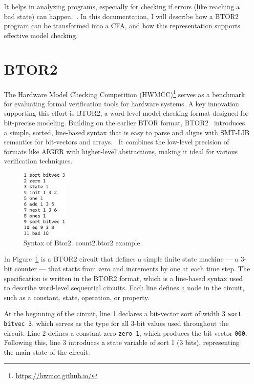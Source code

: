 It helps in analyzing programs, especially for checking if errors (like reaching a bad state) can happen.~\cite{cfa}. In this documentation, I will describe how a BTOR2 program can be transformed into a CFA, and how this representation supports effective model checking.


\section{BTOR2}
The Hardware Model Checking Competition (HWMCC)\footnote{\url{https://hwmcc.github.io/}} serves as a benchmark for evaluating formal verification tools for hardware systems. A key innovation supporting this effort is BTOR2, a word-level model checking format designed for bit-precise modeling. Building on the earlier BTOR format, BTOR2~\cite{btor2} introduces a simple, sorted, line-based syntax that is easy to parse and aligns with SMT-LIB semantics for bit-vectors and arrays.~\cite{SMT-LIB} It combines the low-level precision of formats like AIGER with higher-level abstractions, making it ideal for various verification techniques.~\cite{AIGER}

\begin{figure}[h]
  \centering
  \includegraphics[width=0.2\textwidth]{figures/count2.png}
  \caption{ Syntax of Btor2. count2.btor2 example. }
  \label{fig:count2}
\end{figure}

In Figure~\ref{fig:count2} is a BTOR2 circuit that defines a simple finite state machine — a 3-bit counter — that starts from zero and increments by one at each time step. The specification is written in the BTOR2 format, which is a line-based syntax used to describe word-level sequential circuits. Each line defines a node in the circuit, such as a constant, state, operation, or property.

At the beginning of the circuit, line 1 declares a bit-vector sort of width 3 \verb|sort bitvec 3|, which serves as the type for all 3-bit values used throughout the circuit. Line 2 defines a constant zero \verb|zero 1|, which produces the bit-vector \verb|000|. Following this, line 3 introduces a state variable of sort 1 (3 bits), representing the main state of the circuit.

